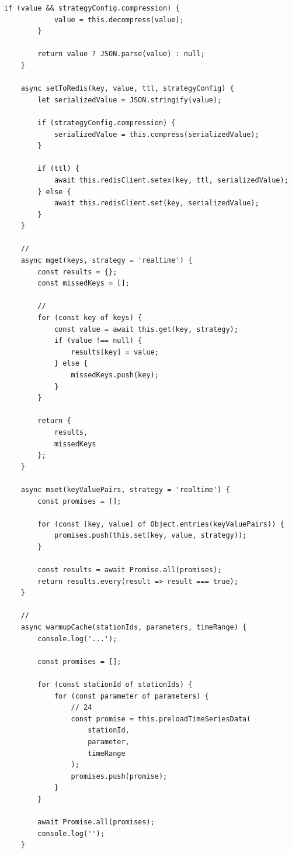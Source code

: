 \begin{lstlisting}[style=javascript]
        if (value && strategyConfig.compression) {
            value = this.decompress(value);
        }
        
        return value ? JSON.parse(value) : null;
    }
    
    async setToRedis(key, value, ttl, strategyConfig) {
        let serializedValue = JSON.stringify(value);
        
        if (strategyConfig.compression) {
            serializedValue = this.compress(serializedValue);
        }
        
        if (ttl) {
            await this.redisClient.setex(key, ttl, serializedValue);
        } else {
            await this.redisClient.set(key, serializedValue);
        }
    }
    
    // 
    async mget(keys, strategy = 'realtime') {
        const results = {};
        const missedKeys = [];
        
        // 
        for (const key of keys) {
            const value = await this.get(key, strategy);
            if (value !== null) {
                results[key] = value;
            } else {
                missedKeys.push(key);
            }
        }
        
        return {
            results,
            missedKeys
        };
    }
    
    async mset(keyValuePairs, strategy = 'realtime') {
        const promises = [];
        
        for (const [key, value] of Object.entries(keyValuePairs)) {
            promises.push(this.set(key, value, strategy));
        }
        
        const results = await Promise.all(promises);
        return results.every(result => result === true);
    }
    
    // 
    async warmupCache(stationIds, parameters, timeRange) {
        console.log('...');
        
        const promises = [];
        
        for (const stationId of stationIds) {
            for (const parameter of parameters) {
                // 24
                const promise = this.preloadTimeSeriesData(
                    stationId, 
                    parameter, 
                    timeRange
                );
                promises.push(promise);
            }
        }
        
        await Promise.all(promises);
        console.log('');
    }
    

\end{lstlisting}
